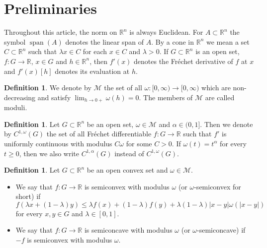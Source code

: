 \documentclass[10pt,a4paper]{amsart}
\theoremstyle{definition}
\newtheorem{definition}[theorem]{Definition}
\newcommand{\R}{\mathbb{R}}
\newcommand{\M}{\mathcal{M}}
\newcommand{\spann}{\operatorname{span}}
\begin{document}
\section{Preliminaries}

Throughout this article, the norm on $ \R^n $ is always Euclidean. For $ A\subset\R^n $ the symbol $ \spann(A) $ denotes the linear span of $ A $. By a cone in $ \R^n $ we mean a set $ C\subset\R^n $ such that $ \lambda x\in C $ for each $ x\in C $ and $ \lambda>0 $. If $ G\subset\R^n $ is an open set, $ f:G\to\R $, $ x\in G $ and $ h\in\R^n $, then $ f'(x) $ denotes the Fréchet derivative of $ f $ at $ x $ and $ f'(x)[h] $ denotes its evaluation at $ h $.

\begin{definition}\label{de_modulus}
We denote by $ \M $ the set of all $ \omega:[0,\infty)\to[0,\infty) $ which are non-decreasing and satisfy $ \lim_{h\to0+}\omega(h)=0 $. The members of $ \M $ are called moduli.
\end{definition}


\begin{definition}
Let $ G\subset\R^n $ be an open set, $ \omega\in\M $ and $ \alpha\in (0,1] $. Then we denote by $ C^{1,\omega}(G) $ the set of all Fréchet differentiable $ f:G\to\R $ such that $ f' $ is uniformly continuous with modulus $ C\omega $ for some $ C>0 $. If $ \omega(t)=t^{\alpha} $ for every $ t\geq 0 $, then we also write $ C^{1,\alpha}(G) $ instead of $ C^{1,\omega}(G) $.
\end{definition}



\begin{definition}\label{de_semiconvex}
Let $ G\subset\R^n $ be an open convex set and $ \omega\in\M $.
\begin{itemize}
\item We say that $ f:G\to\R $ is semiconvex with modulus $ \omega $ (or $ \omega $-semiconvex for short) if
\begin{equation*}
f(\lambda x+(1-\lambda)y)\leq\lambda f(x)+(1-\lambda)f(y)+\lambda(1-\lambda)\vert x-y\vert\omega(\vert x-y\vert)
\end{equation*}
for every $ x,y\in G $ and $ \lambda\in[0,1] $.
\item We say that $ f:G\to\R $ is semiconcave with modulus $ \omega $ (or $ \omega $-semiconcave) if $ -f $ is semiconvex with modulus $ \omega $.
\end{itemize}
\end{definition}
\end{document}
